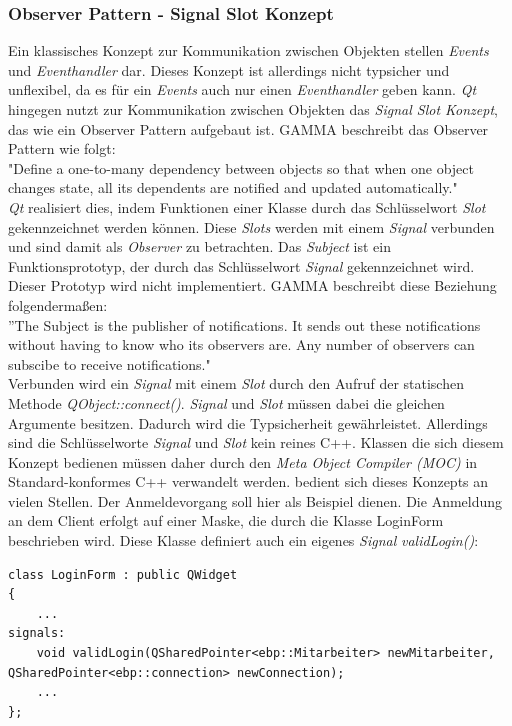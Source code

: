 \subsubsection{Observer Pattern - Signal Slot Konzept}
Ein klassisches Konzept zur Kommunikation zwischen Objekten stellen \textit{Events} und \textit{Eventhandler} dar. Dieses Konzept ist allerdings nicht typsicher und unflexibel, da es für ein \textit{Events} auch nur einen \textit{Eventhandler} geben kann\cite[S. 32]{Qt4}. \textit{Qt} hingegen nutzt zur Kommunikation zwischen Objekten das \textit{Signal Slot Konzept}, das wie ein Observer Pattern aufgebaut ist. GAMMA beschreibt das Observer Pattern wie folgt: \\
"Define a one-to-many dependency between objects so that when one object changes state, all its dependents are notified and updated automatically\cite[S. 293]{Entwurfsmuster}."\\
\textit{Qt} realisiert dies, indem Funktionen einer Klasse durch das Schlüsselwort \textit{Slot} gekennzeichnet werden können. Diese \textit{Slots} werden mit einem \textit{Signal} verbunden und sind damit als \textit{Observer} zu betrachten. Das \textit{Subject} ist ein Funktionsprototyp, der durch das Schlüsselwort \textit{Signal} gekennzeichnet wird. Dieser Prototyp wird nicht implementiert. GAMMA beschreibt diese Beziehung folgendermaßen:\\
''The Subject is the publisher of notifications. It sends out these notifications without having  to know who its observers are. Any number of observers can subscibe to receive notifications\cite[S. 294]{Entwurfsmuster}."\\
Verbunden wird ein \textit{Signal} mit einem \textit{Slot} durch den Aufruf der statischen Methode \textit{QObject::connect()}. \textit{Signal} und \textit{Slot} müssen dabei die gleichen Argumente besitzen. Dadurch wird die Typsicherheit gewährleistet. Allerdings sind die Schlüsselworte \textit{Signal} und \textit{Slot} kein reines C++. Klassen die sich diesem Konzept bedienen müssen daher durch den \textit{Meta Object Compiler (MOC)} in Standard-konformes C++ verwandelt werden\cite[Vgl. S. 51]{Qt4}.
\EBP bedient sich dieses Konzepts an vielen Stellen. Der Anmeldevorgang soll hier als Beispiel dienen. Die Anmeldung an dem Client erfolgt auf einer Maske, die durch die Klasse LoginForm beschrieben wird. Diese Klasse definiert auch ein eigenes \textit{Signal} \textit{validLogin()}:
\begin{lstlisting}
class LoginForm : public QWidget
{
    ...
signals:
    void validLogin(QSharedPointer<ebp::Mitarbeiter> newMitarbeiter, QSharedPointer<ebp::connection> newConnection);
    ...
};
\end{lstlisting}
